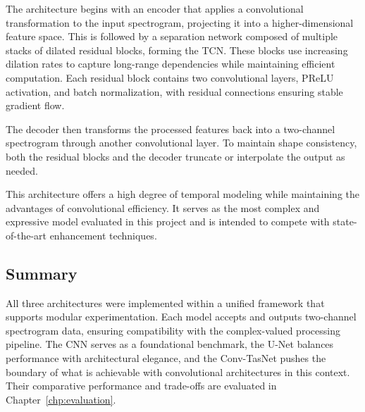 The architecture begins with an encoder that applies a convolutional transformation to the input spectrogram, projecting it into a higher-dimensional feature space. This is followed by a separation network composed of multiple stacks of dilated residual blocks, forming the TCN. These blocks use increasing dilation rates to capture long-range dependencies while maintaining efficient computation. Each residual block contains two convolutional layers, PReLU activation, and batch normalization, with residual connections ensuring stable gradient flow.

The decoder then transforms the processed features back into a two-channel spectrogram through another convolutional layer. To maintain shape consistency, both the residual blocks and the decoder truncate or interpolate the output as needed.

This architecture offers a high degree of temporal modeling while maintaining the advantages of convolutional efficiency. It serves as the most complex and expressive model evaluated in this project and is intended to compete with state-of-the-art enhancement techniques.

\subsection{Summary}

All three architectures were implemented within a unified framework that supports modular experimentation. Each model accepts and outputs two-channel spectrogram data, ensuring compatibility with the complex-valued processing pipeline. The CNN serves as a foundational benchmark, the U-Net balances performance with architectural elegance, and the Conv-TasNet pushes the boundary of what is achievable with convolutional architectures in this context. Their comparative performance and trade-offs are evaluated in Chapter~\ref{chp:evaluation}.


